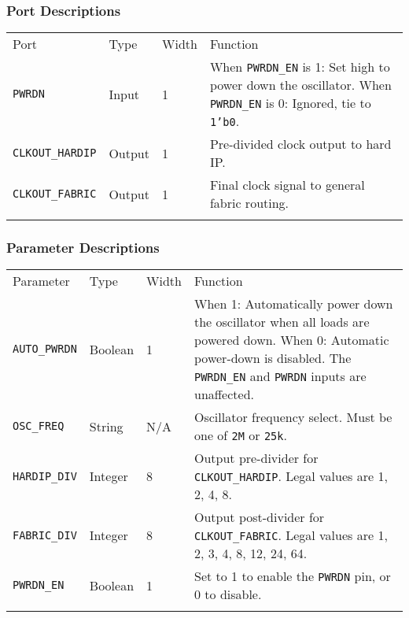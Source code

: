\documentclass[11pt]{article}
\newcommand{\tokenstyle}[1]{\texttt{#1}}
\newcommand{\valuestyle}[1]{\texttt{#1}}
\newcommand{\strvaluestyle}[1]{\valuestyle{\textquotedbl#1\textquotedbl}}
\newcommand{\datastyle}[1]{\texttt{#1}}
\newcommand{\whenstyle}[1]{{\fontseries{sb}\selectfont#1}}
\newcommand{\thinhline}{\Xhline{1\arrayrulewidth}}
\newcommand{\thickhline}{\Xhline{2.5\arrayrulewidth}}
\begin{document}
\subsubsection{Port Descriptions}

\begin{tabularx}{\textwidth}{lllX}
\thinhline
\whenstyle{Port} & \whenstyle{Type} & \whenstyle{Width} & \whenstyle{Function} \\
\thickhline
\tokenstyle{PWRDN} & Input & 1 &
	\whenstyle{When \tokenstyle{PWRDN\_EN} is 1:} Set high to power down the oscillator. \newline
	\whenstyle{When \tokenstyle{PWRDN\_EN} is 0:} Ignored, tie to \datastyle{1'b0}.\\
\thinhline
\tokenstyle{CLKOUT\_HARDIP} & Output & 1 & Pre-divided clock output to hard IP. \\
\thinhline
\tokenstyle{CLKOUT\_FABRIC} & Output & 1 & Final clock signal to general fabric routing. \\
\thinhline
\end{tabularx}

\subsubsection{Parameter Descriptions}

\begin{tabularx}{\textwidth}{lllX}
\thinhline
\whenstyle{Parameter} & \whenstyle{Type} & \whenstyle{Width} & \whenstyle{Function} \\
\thickhline
\tokenstyle{AUTO\_PWRDN} & Boolean & 1 &
	\whenstyle{When 1:} Automatically power down the oscillator when all loads are powered down. \newline
	\whenstyle{When 0:} Automatic power-down is disabled. The \tokenstyle{PWRDN\_EN} and \tokenstyle{PWRDN} inputs are unaffected.\\
\thinhline
\tokenstyle{OSC\_FREQ} & String & N/A & Oscillator frequency select. Must be one of \strvaluestyle{2M} or \strvaluestyle{25k}. \\
\thinhline
\tokenstyle{HARDIP\_DIV} & Integer & 8 &
	Output pre-divider for \tokenstyle{CLKOUT\_HARDIP}. Legal values are 1, 2, 4, 8. \\
\thinhline
\tokenstyle{FABRIC\_DIV} & Integer & 8 &
	Output post-divider for \tokenstyle{CLKOUT\_FABRIC}. Legal values are 1, 2, 3, 4, 8, 12, 24, 64. \\
\thinhline
\tokenstyle{PWRDN\_EN} & Boolean & 1 & Set to 1 to enable the \tokenstyle{PWRDN} pin, or 0 to disable. \\
\thinhline
\end{tabularx}
\end{document}
